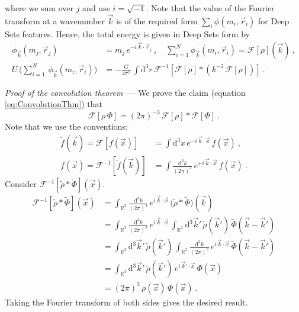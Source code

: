 \documentclass[10pt]{article}
\renewcommand{\paragraph}[1]{\par\addvspace{1.5ex}\noindent\textsl{#1}~---}
\renewcommand{\d}{\mathrm{d}}
\begin{document}
where we sum over $j$ and use $i=\sqrt{-1}$.
Note that the value of the Fourier transform at a wavenumber $\vec{k}$ is of the required form $\sum_i \phi(m_i, \vec{r}_i)$ for Deep Sets features.
Hence, the total energy is given in Deep Sets form by
\begin{align}
    \phi_{\vec{k}}(m_j, \vec{r}_j)
    &=m_j \, e^{-i \, \vec{k} \cdot \vec{r}_j}
    ~,
    \quad
    \sum_{i=1}^{N} \phi_{\vec{k}}(m_i, \vec{r}_i)
    = \mathcal{F}[\rho](\vec{k})~,
    \nonumber\\
    U \, \big( \sum_{i=1}^{N} \, \phi_{\vec{k}}(m_i, \vec{r}_i) \big)
    &= -\frac{G}{4 \pi^2} \,
        \int \d^3 r \,
        \mathcal{F}^{-1} \left[
            \mathcal{F}[\rho] \ast \left(
            k^{-2} \, \mathcal{F}[\rho] \right)
        \right]~.
\end{align}



\paragraph{Proof of the convolution theorem} We prove the claim (equation \eqref{eq:ConvolutionThm}) that
\begin{equation}
    \mathcal{F}[\rho \, \Phi] 
    = (2\pi)^{-3} \, \mathcal{F}[\rho] \ast \mathcal{F}[\Phi] ~.
\end{equation}
Note that we use the conventions:
\begin{align}
    \tilde{f}(\vec{k})
    = \mathcal{F}[f(\vec{x})]
    &= \int \d^3 x
        \, e^{-i \, \vec{k} \cdot \vec{x}}
        \, f(\vec{x})~, \\
    f(\vec{x})
    = \mathcal{F}^{-1}[\tilde{f}(\vec{k})]
    &= \int \frac{\d^3 k}{(2\pi)^3}
        \, e^{+i \, \vec{k} \cdot \vec{x}}
        \, f(\vec{x})~.
\end{align}
Consider $\mathcal{F}^{-1}[\tilde{\rho} \ast \tilde{\Phi}](\vec{x})$. 
\begin{align}
    \mathcal{F}^{-1}[\tilde{\rho} \ast \tilde{\Phi}](\vec{x})
    &= \int_{\mathbb{R}^3} \frac{\d^3 k}{(2\pi)^3}
        \, e^{i \, \vec{k} \cdot \vec{x}} 
        \, \big( \tilde{\rho} \ast \tilde{\Phi} \big) (\vec{k}) 
        \nonumber\\
    &= \int_{\mathbb{R}^3} \frac{\d^3 k}{(2\pi)^3}
        \, e^{i \, \vec{k} \cdot \vec{x}} 
        \, \int_{\mathbb{R}^3} \d^3 \vec{k}' 
        \, \tilde{\rho}(\vec{k}') 
        \, \tilde{\Phi}(\vec{k} - \vec{k}')
        \nonumber\\
    &= \int_{\mathbb{R}^3} \d^3 \vec{k}'
        \, \tilde{\rho}(\vec{k}') 
        \, \int_{\mathbb{R}^3} \frac{\d^3 k}{(2\pi)^3}
        \, e^{i \, \vec{k} \cdot \vec{x}} 
        \, \tilde{\Phi}(\vec{k} - \vec{k}')
        \nonumber\\
    &= \int_{\mathbb{R}^3} \d^3 \vec{k}'
        \, \tilde{\rho}(\vec{k}') 
        \, e^{i \, \vec{k}' \cdot \vec{x}}
        \, \Phi(\vec{x})
        \nonumber\\
    &= (2\pi)^3
        \, \rho(\vec{x}) 
        \, \Phi(\vec{x})~.
\end{align}
Taking the Fourier transform of both sides gives the desired result.
\end{document}
